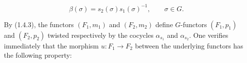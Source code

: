 \begin{equation}
  \beta(\sigma)=s_2(\sigma)s_1(\sigma)^{-1},
  \qquad \sigma\in G.
  \tag{1.4.5.3}
\end{equation}

By (1.4.3), the functors $(F_1,m_1)$ and $(F_2,m_2)$ define
$G$-functors $(F_1,p_1)$ and $(F_2,p_2)$ twisted respectively by the
cocycles $\alpha_{s_1}$ and $\alpha_{s_2}$. One verifies immediately
that the morphism $u\colon F_1\to F_2$ between the underlying functors
has the following property:

